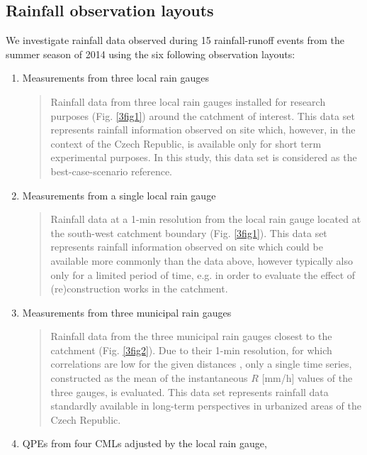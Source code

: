 \documentclass{ctuthesis}\usepackage[]{graphicx}\usepackage[]{color}
\begin{document}
\subsection{Rainfall observation layouts} 

We investigate rainfall data observed during 15 rainfall-runoff events from the summer season of 2014 using the six following observation layouts: 
\begin{enumerate}
        \item Measurements from three local rain gauges
                \begin{quote}
                Rainfall data from three local rain gauges installed for research purposes (Fig. \ref{3fig1}) around the catchment of interest. 
                This data set represents rainfall information observed on site which, however, in the context of the Czech Republic, is available only for short term experimental purposes. In this study, this data set is considered as the best-case-scenario reference.
                \end{quote}
        \item Measurements from a single local rain gauge 
                \begin{quote}
                Rainfall data at a 1-min resolution from the local rain gauge located at the south-west catchment boundary (Fig. \ref{3fig1}).
                This data set represents rainfall information observed on site which could be available more commonly than the data above, however typically also only for a limited period of time, e.g. in order to evaluate the effect of (re)construction works in the catchment.
                \end{quote}
         \item Measurements from three municipal rain gauges
                \begin{quote}
                Rainfall data from the three municipal rain gauges closest to the catchment (Fig. \ref{3fig2}). Due to their 1-min resolution, for which correlations are low for the given distances \citep{villariniRainfallSamplingUncertainties2008}, only a  single time series, constructed as the mean of the instantaneous $R$ [mm/h] values of the three gauges, is evaluated.
                This data set represents rainfall data standardly available in long-term perspectives in urbanized areas of the Czech Republic.
                \end{quote}
        \item QPEs from four CMLs adjusted by the local rain gauge, 

\end{enumerate}
\end{document}
